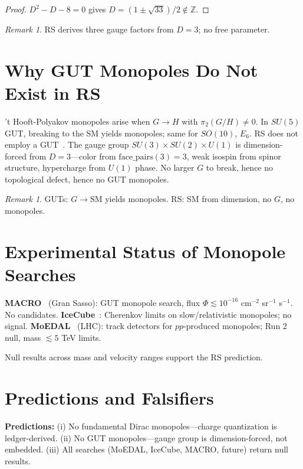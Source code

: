 \documentclass[12pt,a4paper]{article}
\theoremstyle{definition}
\theoremstyle{remark}
\newtheorem{remark}[theorem]{Remark}
\begin{document}
\begin{proof}
$D^2 - D - 8 = 0$ gives $D = (1 \pm \sqrt{33})/2 \notin \mathbb{Z}$.
\end{proof}

\begin{remark}
RS derives three gauge factors from $D = 3$; no free parameter.
\end{remark}

\section{Why GUT Monopoles Do Not Exist in RS}
\label{sec:no-gut-monopoles}

't Hooft-Polyakov monopoles arise when $G \to H$ with $\pi_2(G/H)
\neq 0$.  In $SU(5)$ GUT, breaking to the SM yields monopoles; same for
$SO(10)$, $E_6$.  RS does not employ a GUT~\cite{RS_Gauge}.  The gauge
group $SU(3) \times SU(2) \times U(1)$ is dimension-forced from
$D = 3$---color from $\mathrm{face\_pairs}(3) = 3$, weak isospin from
spinor structure, hypercharge from $U(1)$ phase.  No larger $G$ to
break, hence no topological defect, hence no GUT monopoles.

\begin{remark}
GUTs: $G \to \mathrm{SM}$ yields monopoles.  RS: SM from dimension,
no $G$, no monopoles.
\end{remark}

\section{Experimental Status of Monopole Searches}
\label{sec:experimental}

\textbf{MACRO}~\cite{MACRO} (Gran Sasso): GUT monopole search, flux
$\Phi \lesssim 10^{-16}$ cm$^{-2}$ sr$^{-1}$ s$^{-1}$.  No candidates.
\textbf{IceCube}~\cite{IceCube}: Cherenkov limits on slow/relativistic
monopoles; no signal.  \textbf{MoEDAL}~\cite{MoEDAL} (LHC): track
detectors for $pp$-produced monopoles; Run 2 null, mass $\lesssim 5$
TeV limits.

Null results across mass and velocity ranges support the RS prediction.

\section{Predictions and Falsifiers}
\label{sec:predictions}

\textbf{Predictions:} (i) No fundamental Dirac monopoles---charge
quantization is ledger-derived.  (ii) No GUT monopoles---gauge group
is dimension-forced, not embedded.  (iii) All searches (MoEDAL,
IceCube, MACRO, future) return null results.
\end{document}
